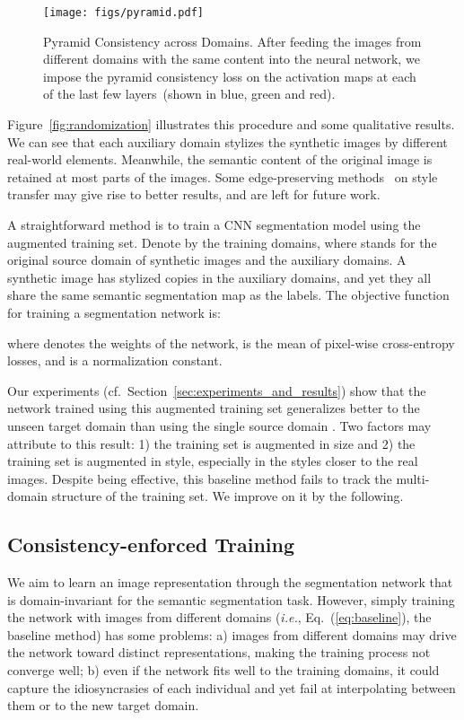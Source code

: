\documentclass[10pt,twocolumn,letterpaper]{article}
\begin{document}
\begin{figure*}[t]
  \centering
  \texttt{[image: figs/pyramid.pdf]}
  \vspace{2mm}
  \caption{Pyramid Consistency  across Domains. After feeding the images from different domains with the same content  into the neural network, we impose the pyramid consistency loss on the activation maps at each of the last few layers~(shown in blue, green and red).}
  \label{fig:consistency}
  
\end{figure*}


Figure~\ref{fig:randomization} illustrates this procedure and some qualitative results. We can see that each auxiliary domain stylizes the synthetic images by different real-world elements. Meanwhile, the semantic content of the original image is retained at most parts of the images. Some edge-preserving methods~\cite{li2017laplacian} on style transfer may give rise to better results, and are left for future work. 


A straightforward method is to train a CNN segmentation model using the augmented training set. Denote by  the training domains, where  stands for the original source domain of synthetic images and  the auxiliary domains. A synthetic image  has  stylized copies  in the auxiliary domains, and yet they all share the same semantic segmentation map  as the labels.  The objective function for training a  segmentation network  is:

where  denotes the weights of the network,   is the mean of pixel-wise cross-entropy losses, and  is a normalization constant. 

Our experiments (cf.\ Section~\ref{sec:experiments_and_results}) show that the network trained using this augmented training set  generalizes better to the unseen target domain than using the single source domain . Two factors may attribute to this result: 1) the training set is augmented in size and 2) the training set is augmented in style, especially in the styles closer to the real images. Despite being effective, this baseline method fails to track the multi-domain structure of the training set. We improve on it by the following.


\subsection{Consistency-enforced Training}
We aim to learn an image representation through the segmentation network that is domain-invariant for the semantic segmentation task. However, simply training the network with images from different domains (\textit{i.e.}, Eq.~(\ref{eq:baseline}), the baseline method) has some problems: a) images from different domains may drive the network toward distinct representations, making the training process not converge well; b) even if the network fits well to the training domains, it could capture the idiosyncrasies of each individual and yet fail at interpolating between them or to the new target domain.
\end{document}
